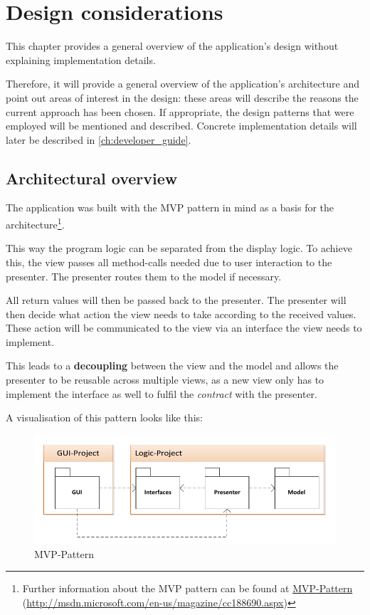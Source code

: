 \chapter{Design considerations}\label{ch:design} %

This chapter provides a general overview of the application's design without explaining implementation details.

Therefore, it will provide a general overview of the application's architecture and point out areas of interest in the design: these areas will describe the reasons the current approach has been chosen. If appropriate, the design patterns that were employed will be mentioned and described. Concrete implementation details will later be described in \autoref{ch:developer_guide}.

\section{Architectural overview}
\label{sec:architectural_overview}

The application was built with the \ac{MVP} pattern in mind as a basis for the architecture\footnote{Further information about the \ac{MVP} pattern can be found at \href{http://msdn.microsoft.com/en-us/magazine/cc188690.aspx}{\ac{MVP}-Pattern} (\url{http://msdn.microsoft.com/en-us/magazine/cc188690.aspx})}.

This way the program logic can be separated from the display logic. To achieve this, the view passes all method-calls needed due to user interaction to the presenter. The presenter routes them to the model if necessary. 

All return values will then be passed back to the presenter. The presenter will then decide what action the view needs to take according to the received values. These action will be communicated to the view via an interface the view needs to implement.

This leads to a \textbf{decoupling} between the view and the model and allows the presenter to be reusable across multiple views, as a new view only has to implement the interface as well to fulfil the \textit{contract} with the presenter.

A visualisation of this pattern looks like this:

\begin{figure}[H]
\begin{center}
\includegraphics[width=\textwidth]{gfx/mvp.pdf}
\caption{\ac{MVP}-Pattern}
\label{fig:mvp}
\end{center}
\end{figure}

